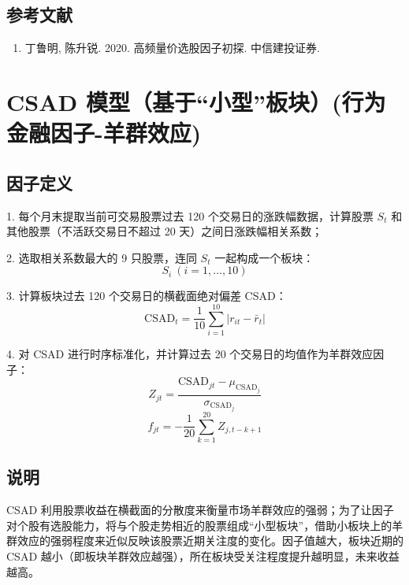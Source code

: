 \documentclass{article}
\begin{document}
\subsection{参考文献}
\begin{enumerate}
    \item 丁鲁明, 陈升锐. 2020. 高频量价选股因子初探. 中信建投证券.
\end{enumerate}

\section{CSAD 模型（基于“小型”板块）(行为金融因子-羊群效应)}

\subsection{因子定义}

1. 每个月末提取当前可交易股票过去 120 个交易日的涨跌幅数据，计算股票 \( S_t \) 和其他股票（不活跃交易日不超过 20 天）之间日涨跌幅相关系数；

2. 选取相关系数最大的 9 只股票，连同 \( S_t \) 一起构成一个板块：
   \begin{equation}
       S_i \ (i = 1, \dots, 10)
   \end{equation}

3. 计算板块过去 120 个交易日的横截面绝对偏差 CSAD：
   \begin{equation}
       \mathrm{CSAD}_t = \frac{1}{10} \sum_{i=1}^{10} |r_{it} - \bar{r}_t|
   \end{equation}

4. 对 CSAD 进行时序标准化，并计算过去 20 个交易日的均值作为羊群效应因子：
   \begin{equation}
       Z_{jt} = \frac{\mathrm{CSAD}_{jt} - \mu_{\mathrm{CSAD}_j}}{\sigma_{\mathrm{CSAD}_j}}
   \end{equation}
   \begin{equation}
       f_{jt} = -\frac{1}{20} \sum_{k=1}^{20} Z_{j,t-k+1}
   \end{equation}

\subsection{说明}
CSAD 利用股票收益在横截面的分散度来衡量市场羊群效应的强弱；为了让因子对个股有选股能力，将与个股走势相近的股票组成“小型板块”，借助小板块上的羊群效应的强弱程度来近似反映该股票近期关注度的变化。因子值越大，板块近期的 CSAD 越小（即板块羊群效应越强），所在板块受关注程度提升越明显，未来收益越高。
\end{document}
